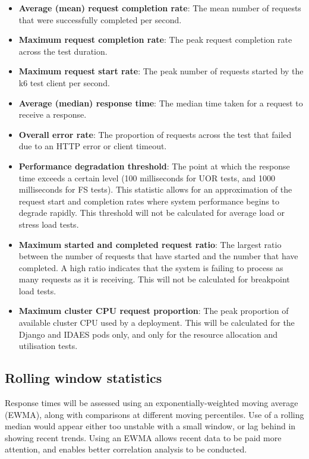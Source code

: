\begin{itemize}[itemsep=0pt]
    \item \textbf{Average (mean) request completion rate}: The mean number of requests that were successfully completed per second.
    \item \textbf{Maximum request completion rate}: The peak request completion rate across the test duration.
    \item \textbf{Maximum request start rate}: The peak number of requests started by the k6 test client per second.
    \item \textbf{Average (median) response time}: The median time taken for a request to receive a response.
    \item \textbf{Overall error rate}: The proportion of requests across the test that failed due to an HTTP error or client timeout.
    \item \textbf{Performance degradation threshold}: The point at which the response time exceeds a certain level (100 milliseconds for UOR tests, and 1000 milliseconds for FS tests). This statistic allows for an approximation of the request start and completion rates where system performance begins to degrade rapidly. This threshold will not be calculated for average load or stress load tests.
    \item \textbf{Maximum started and completed request ratio}: The largest ratio between the number of requests that have started and the number that have completed. A high ratio indicates that the system is failing to process as many requests as it is receiving. This will not be calculated for breakpoint load tests.
    \item \textbf{Maximum cluster CPU request proportion}: The peak proportion of available cluster CPU used by a deployment. This will be calculated for the Django and IDAES pods only, and only for the resource allocation and utilisation tests.
\end{itemize}

\subsection{Rolling window statistics}

Response times will be assessed using an exponentially-weighted moving average (EWMA), along with comparisons at different moving percentiles. Use of a rolling median would appear either too unstable with a small window, or lag behind in showing recent trends. Using an EWMA allows recent data to be paid more attention, and enables better correlation analysis to be conducted.


